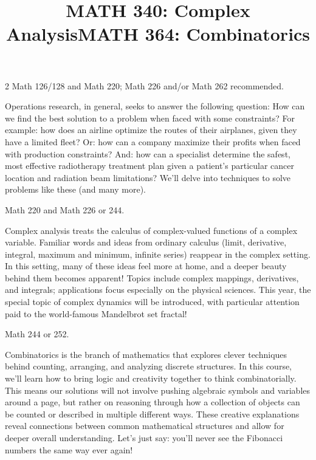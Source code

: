 \documentclass[12pt]{article}
\newcommand{\bolder}{\textbf}
\begin{document}
\begin{multicols}{2}
 Math 126/128 and Math 220; Math 226 and/or Math 262 recommended.

Operations research, in general, seeks to answer the following question: How can we find the best solution to a problem when faced with some constraints? For example: how does an airline optimize the routes of their airplanes, given they have a limited fleet? Or: how can a company maximize their profits when faced with production constraints? And: how can a specialist determine the safest, most effective radiotherapy treatment plan given a patient’s particular cancer location and radiation beam limitations?   We’ll delve into techniques to solve problems like these (and many more).


\begin{tcolorbox}[colback=white, colframe=black]
    \begin{center}
    \title{{\large \bolder{MATH 340: Complex Analysis}}}
    \end{center}
\end{tcolorbox}

 Math 220 and Math 226 or 244.

Complex analysis treats the calculus of complex-valued functions of a complex variable. Familiar words and ideas from ordinary calculus (limit, derivative, integral, maximum and minimum, infinite series) reappear in the complex setting. In this setting, many of these ideas feel more at home, and a deeper beauty behind them becomes apparent! Topics include complex mappings, derivatives, and integrals; applications focus especially on the physical sciences. This year, the special topic of complex dynamics will be introduced, with particular attention paid to the world-famous Mandelbrot set fractal!


\begin{tcolorbox}[colback=white, colframe=black]
    \begin{center}
    \title{{\large \bolder{MATH 364: Combinatorics}}}
    \end{center}
\end{tcolorbox}

 Math 244 or 252.

Combinatorics is the branch of mathematics that explores clever techniques behind counting, arranging, and analyzing discrete structures. In this course, we’ll learn how to bring logic and creativity together to think combinatorially.  This means our solutions will not involve pushing algebraic symbols and variables around a page, but rather on reasoning through how a collection of objects can be counted or described in multiple different ways.  These creative explanations reveal connections between common mathematical structures and allow for deeper overall understanding.  Let's just say: you'll never see the Fibonacci numbers the same way ever again!



\end{multicols}
\end{document}
